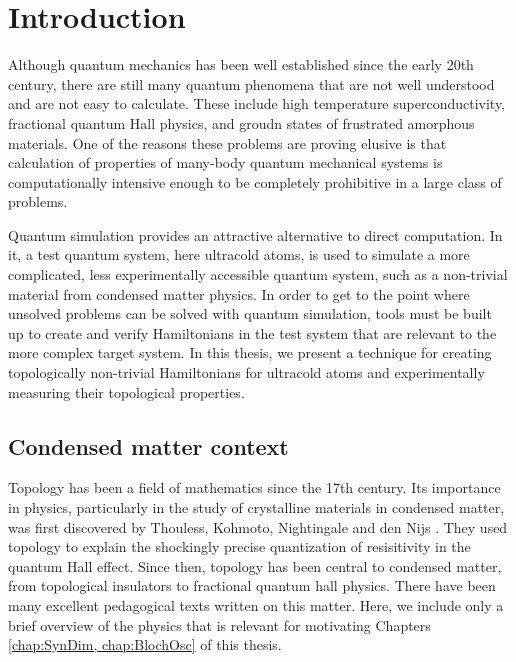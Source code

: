 \renewcommand{\thechapter}{1}

\chapter{Introduction}\label{chap:Chern}
Although quantum mechanics has been well established since the early 20th century, there are still many quantum phenomena that are not well understood and are not easy to calculate. These include high temperature superconductivity, fractional quantum Hall physics, and groudn states of frustrated amorphous materials. One of the reasons these problems are proving elusive is that calculation of properties of many-body quantum mechanical systems is computationally intensive enough to be completely prohibitive in a large class of problems. 

Quantum simulation provides an attractive alternative to direct computation. In it, a test quantum system, here ultracold atoms, is used to simulate a more complicated, less experimentally accessible quantum system, such as a non-trivial material from condensed matter physics. In order to get to the point where unsolved problems can be solved with quantum simulation, tools must be built up to create and verify Hamiltonians in the test system that are relevant to the more complex target system. In this thesis, we present a technique for creating topologically non-trivial Hamiltonians for ultracold atoms and experimentally measuring their topological properties.

\section{Condensed matter context}
Topology has been a field of mathematics since the 17th century. Its importance in physics, particularly in the study of crystalline materials in condensed matter, was first discovered by Thouless, Kohmoto, Nightingale and den Nijs \cite{Thouless1982}. They used topology to explain the shockingly precise quantization of resisitivity in the quantum Hall effect. Since then, topology has been central to condensed matter, from topological insulators\cite{Qi2011} to fractional quantum hall physics\cite{Stormer1999}. There have been many excellent pedagogical texts written on this matter. Here, we include only a brief overview of the physics that is relevant for motivating Chapters \ref{chap:SynDim, chap:BlochOsc} of this thesis.  


